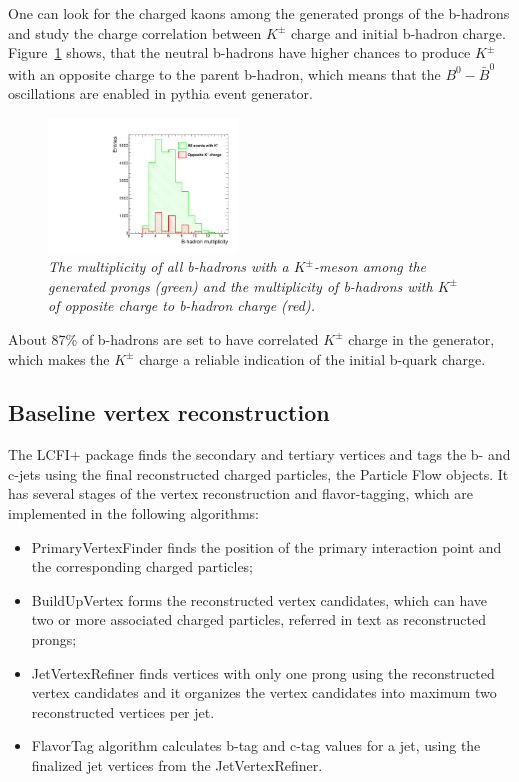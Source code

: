 One can look for the charged kaons among the generated prongs of the b-hadrons and study the charge correlation between $K^\pm$ charge and initial b-hadron charge. Figure~\ref{fig:KaonOscillation_3} shows, that the neutral b-hadrons have higher chances to produce $K^\pm$ with an opposite charge to the parent b-hadron, which means that the $B^0-\bar{B}^0$ oscillations are enabled in {\sc pythia} event generator.

\begin{figure}[h]
{\centering
    \includegraphics[width=0.45\textwidth]{ILD/plots/kaon-oscillation.pdf}
    \caption{\sl The multiplicity of all b-hadrons with a $K^\pm$-meson among the generated prongs (green) and the multiplicity of b-hadrons with $K^\pm$ of opposite charge to b-hadron charge (red).
    }
    \label{fig:KaonOscillation_3}
  }
\end{figure}

About 87\% of b-hadrons are set to have correlated $K^\pm$ charge in the generator, which makes the $K^\pm$ charge a reliable indication of the initial b-quark charge.


\subsection{Baseline vertex reconstruction}
The LCFI+ package finds the secondary and tertiary vertices and tags the b- and c-jets using the final reconstructed charged particles, the Particle Flow objects.
It has several stages of the vertex reconstruction and flavor-tagging, which are implemented in the following algorithms:
\begin{itemize}
\item PrimaryVertexFinder finds the position of the primary interaction point and the corresponding charged particles;
\item BuildUpVertex forms the reconstructed vertex candidates, which can have two or more associated charged particles, referred in text as reconstructed prongs;
\item JetVertexRefiner finds vertices with only one prong using the reconstructed vertex candidates and it organizes the vertex candidates into maximum two reconstructed vertices per jet.
\item FlavorTag algorithm calculates b-tag and c-tag values for a jet, using the finalized jet vertices from the JetVertexRefiner.
\end{itemize}

